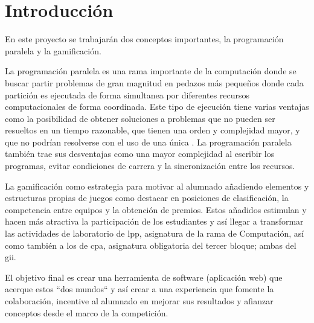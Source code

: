 \documentclass[11pt,spanish,listoffigures,listoftables]{tfgetsinf}
\begin{document}
\begin{abstract}[english]

... \par

... \par

... \par

\end{abstract}

\mainmatter

\chapter{Introducción}

En este proyecto se trabajarán dos conceptos importantes, la programación paralela y la gamificación. \par

La programación paralela es una rama importante de la computación donde se buscar partir problemas de gran magnitud en pedazos más pequeños donde cada partición es ejecutada de forma simultanea por diferentes recursos computacionales de forma coordinada. Este tipo de ejecución tiene varias ventajas como la posibilidad de obtener soluciones a problemas que no pueden ser resueltos en un tiempo razonable, que tienen una orden y complejidad mayor, y que no podrían resolverse con el uso de una única . La programación paralela también trae sus desventajas como una mayor complejidad al escribir los programas, evitar condiciones de carrera y la sincronización entre los recursos. \par

La gamificación como estrategia para motivar al alumnado añadiendo elementos y estructuras propias de juegos como destacar en posiciones de clasificación, la competencia entre equipos y la obtención de premios. Estos añadidos estimulan y hacen más atractiva la participación de los estudiantes y así llegar a transformar las actividades de laboratorio de \acrfull{lpp}, asignatura de la rama de Computación, así como también a los de \acrfull{cpa}, asignatura obligatoria del tercer bloque; ambas del \acrfull{gii}. \par

El objetivo final es crear una herramienta de software (aplicación web) que acerque estos ``dos mundos`` y así crear a una experiencia que fomente la colaboración, incentive al alumnado en mejorar sus resultados y afianzar conceptos desde el marco de la competición.
\end{document}

